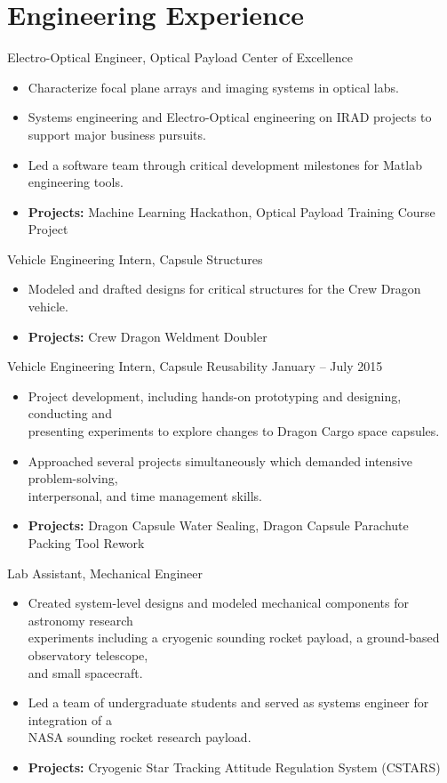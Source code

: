 \documentclass[10pt,final,sans]{resume}
\begin{document}
\section{Engineering Experience}
Electro-Optical Engineer, Optical Payload Center of Excellence
\begin{itemize}
  \item Characterize focal plane arrays and imaging systems in optical labs.
  \item Systems engineering and Electro-Optical engineering on IRAD projects to support major business pursuits.
  \item Led a software team through critical development milestones for Matlab engineering tools. 
  \item {\bf Projects:} Machine Learning Hackathon, Optical Payload Training Course Project
\end{itemize} 
Vehicle Engineering Intern, Capsule Structures
\begin{itemize}
  \item Modeled and drafted designs for critical structures for the Crew Dragon vehicle.
  \item {\bf Projects:} Crew Dragon Weldment Doubler
\end{itemize}

Vehicle Engineering Intern, Capsule Reusability \hfill January -- July 2015
\begin{itemize}
  \item Project development, including hands-on prototyping and designing, conducting and \\
  presenting experiments to explore changes to Dragon Cargo space capsules.
  \item Approached several projects simultaneously which demanded intensive problem-solving, \\
  interpersonal, and time management skills.
  \item {\bf Projects:} Dragon Capsule Water Sealing, Dragon Capsule Parachute Packing Tool Rework
\end{itemize}

Lab Assistant, Mechanical Engineer
\begin{itemize}
  \item Created system-level designs and modeled mechanical components for astronomy research \\ 
  experiments including a cryogenic sounding rocket payload, a ground-based observatory telescope, \\
  and small spacecraft.
  \item Led a team of undergraduate students and served as systems engineer for integration of a \\
  NASA sounding rocket research payload.
  \item {\bf Projects:} Cryogenic Star Tracking Attitude Regulation System (CSTARS)
\end{itemize}
\end{document}
